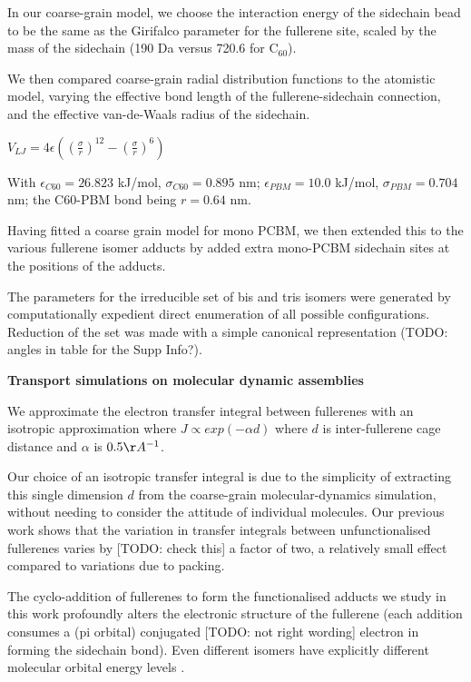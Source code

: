 \documentclass[journal=nanofd,manuscript=suppinfo]{achemso}
\begin{document}
In our coarse-grain model, we choose the interaction energy of the sidechain bead to be the same as the Girifalco parameter for the fullerene site, scaled by the mass of the sidechain (190 Da versus 720.6 for C$_{60}$).

We then compared coarse-grain radial distribution functions to the atomistic model, varying the effective bond length of the fullerene-sidechain connection, and the effective van-de-Waals radius of the sidechain.

$ V_{LJ} = 4 \epsilon (\left ( \frac{\sigma}{r} \right )^{12} - \left(\frac{\sigma}{r}\right )^{6}) $

With $\epsilon_{C60}=26.823$ kJ/mol, $\sigma_{C60}=0.895$ nm; $\epsilon_{PBM}=10.0$ kJ/mol, $\sigma_{PBM}=0.704$ nm; the C60-PBM bond being $r=0.64$ nm.

Having fitted a coarse grain model for mono PCBM, we then extended this to the various fullerene isomer adducts by added extra mono-PCBM sidechain sites at the positions of the adducts.

The parameters for the irreducible set of bis and tris isomers were generated by computationally expedient direct enumeration of all possible configurations. Reduction of the set was made with a simple canonical representation (TODO: angles in table for the Supp Info?).

\textbf{Transport simulations on molecular dynamic assemblies}

We approximate the electron transfer integral between fullerenes with an isotropic approximation where $J \propto exp (-\alpha d)$ where $d$ is inter-fullerene cage distance and $\alpha$ is $0.5 \AA^{-1}$.

Our choice of an isotropic transfer integral is due to the simplicity of extracting this single dimension $d$ from the coarse-grain molecular-dynamics simulation, without needing to consider the attitude of individual molecules. Our previous work\cite{kwaitowski_fullerene} shows that the variation in transfer integrals between unfunctionalised fullerenes varies by [TODO: check this] a factor of two, a relatively small effect compared to variations due to packing.

The cyclo-addition of fullerenes to form the functionalised adducts we study in this work profoundly alters the electronic structure of the fullerene (each addition consumes a (pi orbital) conjugated [TODO: not right wording] electron in forming the sidechain bond).
Even different isomers have explicitly different molecular orbital energy levels \cite{Jarvist_AM_2010}.
\end{document}
